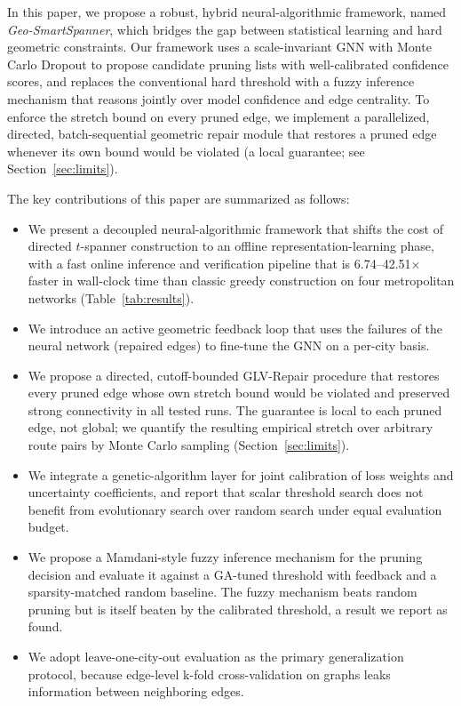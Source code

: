 \documentclass[journal]{IEEEtran}
\begin{document}
In this paper, we propose a robust, hybrid neural-algorithmic framework, named \textit{Geo-SmartSpanner}, which bridges the gap between statistical learning and hard geometric constraints. Our framework uses a scale-invariant GNN with Monte Carlo Dropout to propose candidate pruning lists with well-calibrated confidence scores, and replaces the conventional hard threshold with a fuzzy inference mechanism that reasons jointly over model confidence and edge centrality. To enforce the stretch bound on every pruned edge, we implement a parallelized, directed, batch-sequential geometric repair module that restores a pruned edge whenever its own bound would be violated (a local guarantee; see Section~\ref{sec:limits}).

The key contributions of this paper are summarized as follows:
\begin{itemize}
    \item We present a decoupled neural-algorithmic framework that shifts the cost of directed $t$-spanner construction to an offline representation-learning phase, with a fast online inference and verification pipeline that is 6.74--42.51$\times$ faster in wall-clock time than classic greedy construction on four metropolitan networks (Table~\ref{tab:results}).
    \item We introduce an active geometric feedback loop that uses the failures of the neural network (repaired edges) to fine-tune the GNN on a per-city basis.
    \item We propose a directed, cutoff-bounded GLV-Repair procedure that restores every pruned edge whose own stretch bound would be violated and preserved strong connectivity in all tested runs. The guarantee is local to each pruned edge, not global; we quantify the resulting empirical stretch over arbitrary route pairs by Monte Carlo sampling (Section~\ref{sec:limits}).
    \item We integrate a genetic-algorithm layer for joint calibration of loss weights and uncertainty coefficients, and report that scalar threshold search does not benefit from evolutionary search over random search under equal evaluation budget.
    \item We propose a Mamdani-style fuzzy inference mechanism for the pruning decision and evaluate it against a GA-tuned threshold with feedback and a sparsity-matched random baseline. The fuzzy mechanism beats random pruning but is itself beaten by the calibrated threshold, a result we report as found.
    \item We adopt leave-one-city-out evaluation as the primary generalization protocol, because edge-level k-fold cross-validation on graphs leaks information between neighboring edges.
\end{itemize}
\end{document}
